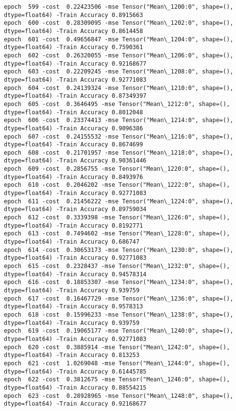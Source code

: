 \documentclass[11pt]{article}
\begin{document}
\begin{Verbatim}[commandchars=\\\{\}]
epoch  599 -cost  0.22423506 -mse Tensor("Mean\_1200:0", shape=(), dtype=float64) -Train Accuracy 0.8915663
epoch  600 -cost  0.28309095 -mse Tensor("Mean\_1202:0", shape=(), dtype=float64) -Train Accuracy 0.8614458
epoch  601 -cost  0.49656847 -mse Tensor("Mean\_1204:0", shape=(), dtype=float64) -Train Accuracy 0.7590361
epoch  602 -cost  0.26320055 -mse Tensor("Mean\_1206:0", shape=(), dtype=float64) -Train Accuracy 0.92168677
epoch  603 -cost  0.22209245 -mse Tensor("Mean\_1208:0", shape=(), dtype=float64) -Train Accuracy 0.92771083
epoch  604 -cost  0.24139324 -mse Tensor("Mean\_1210:0", shape=(), dtype=float64) -Train Accuracy 0.87349397
epoch  605 -cost  0.3646495 -mse Tensor("Mean\_1212:0", shape=(), dtype=float64) -Train Accuracy 0.8012048
epoch  606 -cost  0.23374413 -mse Tensor("Mean\_1214:0", shape=(), dtype=float64) -Train Accuracy 0.9096386
epoch  607 -cost  0.24155532 -mse Tensor("Mean\_1216:0", shape=(), dtype=float64) -Train Accuracy 0.8674699
epoch  608 -cost  0.21701957 -mse Tensor("Mean\_1218:0", shape=(), dtype=float64) -Train Accuracy 0.90361446
epoch  609 -cost  0.2856755 -mse Tensor("Mean\_1220:0", shape=(), dtype=float64) -Train Accuracy 0.8493976
epoch  610 -cost  0.2046202 -mse Tensor("Mean\_1222:0", shape=(), dtype=float64) -Train Accuracy 0.92771083
epoch  611 -cost  0.21456222 -mse Tensor("Mean\_1224:0", shape=(), dtype=float64) -Train Accuracy 0.89759034
epoch  612 -cost  0.3339398 -mse Tensor("Mean\_1226:0", shape=(), dtype=float64) -Train Accuracy 0.8192771
epoch  613 -cost  0.7494602 -mse Tensor("Mean\_1228:0", shape=(), dtype=float64) -Train Accuracy 0.686747
epoch  614 -cost  0.30653173 -mse Tensor("Mean\_1230:0", shape=(), dtype=float64) -Train Accuracy 0.92771083
epoch  615 -cost  0.2328437 -mse Tensor("Mean\_1232:0", shape=(), dtype=float64) -Train Accuracy 0.94578314
epoch  616 -cost  0.18853307 -mse Tensor("Mean\_1234:0", shape=(), dtype=float64) -Train Accuracy 0.939759
epoch  617 -cost  0.16467729 -mse Tensor("Mean\_1236:0", shape=(), dtype=float64) -Train Accuracy 0.9578313
epoch  618 -cost  0.15996233 -mse Tensor("Mean\_1238:0", shape=(), dtype=float64) -Train Accuracy 0.939759
epoch  619 -cost  0.19065177 -mse Tensor("Mean\_1240:0", shape=(), dtype=float64) -Train Accuracy 0.92771083
epoch  620 -cost  0.3885914 -mse Tensor("Mean\_1242:0", shape=(), dtype=float64) -Train Accuracy 0.813253
epoch  621 -cost  1.0269048 -mse Tensor("Mean\_1244:0", shape=(), dtype=float64) -Train Accuracy 0.61445785
epoch  622 -cost  0.3812675 -mse Tensor("Mean\_1246:0", shape=(), dtype=float64) -Train Accuracy 0.88554215
epoch  623 -cost  0.28928965 -mse Tensor("Mean\_1248:0", shape=(), dtype=float64) -Train Accuracy 0.92168677

\end{Verbatim}
\end{document}
